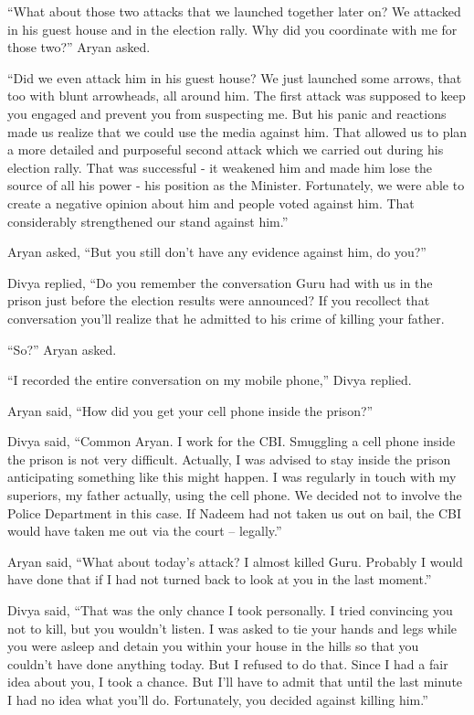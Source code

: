 “What about those two attacks that we launched together later on? We attacked in
his guest house and in the election rally. Why did you coordinate with me for
those two?” Aryan asked.

“Did we even attack him in his guest house? We just launched some arrows, that
too with blunt arrowheads, all around him. The first attack was supposed to keep
you engaged and prevent you from suspecting me. But his panic and reactions made
us realize that we could use the media against him. That allowed us to plan a
more detailed and purposeful second attack which we carried out during his
election rally. That was successful - it weakened him and made him lose the
source of all his power - his position as the Minister. Fortunately, we were
able to create a negative opinion about him and people voted against him. That
considerably strengthened our stand against him.”

Aryan asked, “But you still don't have any evidence against him, do you?”

Divya replied, “Do you remember the conversation Guru had with us in the prison
just before the election results were announced? If you recollect that
conversation you'll realize that he admitted to his crime of killing your
father.

“So?” Aryan asked.

“I recorded the entire conversation on my mobile phone,” Divya replied.

Aryan said, “How did you get your cell phone inside the prison?”

Divya said, “Common Aryan. I work for the CBI. Smuggling a cell phone inside the
prison is not very difficult. Actually, I was advised to stay inside the prison
anticipating something like this might happen. I was regularly in touch with my
superiors, my father actually, using the cell phone. We decided not to involve
the Police Department in this case. If Nadeem had not taken us out on bail, the
CBI would have taken me out via the court – legally.”

Aryan said, “What about today's attack? I almost killed Guru. Probably I would
have done that if I had not turned back to look at you in the last moment.”

Divya said, “That was the only chance I took personally. I tried convincing you
not to kill, but you wouldn't listen. I was asked to tie your hands and legs
while you were asleep and detain you within your house in the hills so that you
couldn't have done anything today. But I refused to do that. Since I had a fair
idea about you, I took a chance. But I'll have to admit that until the last
minute I had no idea what you'll do. Fortunately, you decided against killing
him.”

